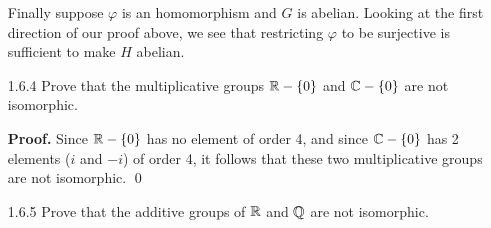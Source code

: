 \begin{enumerate}
      Finally suppose $\varphi$ is an homomorphism and $G$ is abelian. Looking
      at the first direction of our proof above, we see that restricting
      $\varphi$ to be surjective is sufficient to make $H$ abelian.
   \item[1.6.4]   Prove that the multiplicative groups $\mathbb{R} - \{0\}$ and
                  $\mathbb{C} - \{0\}$ are not isomorphic.

      \textbf{Proof.} Since $\mathbb{R} - \{0\}$ has no element of order 4, and since
      $\mathbb{C} - \{0\}$ has 2 elements ($i$ and $-i$) of order 4, it follows that
      these two multiplicative groups are not isomorphic. \qed
   \item[1.6.5]   Prove that the additive groups of $\mathbb{R}$ and $\mathbb{Q}$ are not
                  isomorphic.


\end{enumerate}
